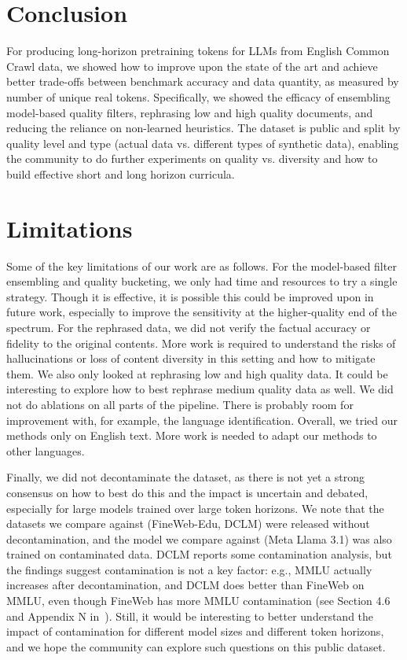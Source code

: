 \documentclass[11pt]{article}
\begin{document}
\section{Conclusion}

For producing long-horizon pretraining tokens for LLMs from English Common Crawl data, we showed how to improve upon the state of the art and achieve better trade-offs between benchmark accuracy and data quantity, as measured by number of unique real tokens. Specifically, we showed the efficacy of ensembling model-based quality filters, rephrasing low and high quality documents, and reducing the reliance on non-learned heuristics. The dataset is public and split by quality level and type (actual data vs. different types of synthetic data), enabling the community to do further experiments on quality vs. diversity and how to build effective short and long horizon curricula.

\section{Limitations}

Some of the key limitations of our work are as follows. For the model-based filter ensembling and quality bucketing, we only had time and resources to try a single strategy. Though it is effective, it is possible this could be improved upon in future work, especially to improve the sensitivity at the higher-quality end of the spectrum. For the rephrased data, we did not verify the factual accuracy or fidelity to the original contents. More work is required to understand the risks of hallucinations or loss of content diversity in this setting and how to mitigate them. We also only looked at rephrasing low and high quality data. It could be interesting to explore how to best rephrase medium quality data as well. We did not do ablations on all parts of the pipeline. There is probably room for improvement with, for example, the language identification. Overall, we tried our methods only on English text. More work is needed to adapt our methods to other languages.

Finally, we did not decontaminate the dataset, as there is not yet a strong consensus on how to best do this and the impact is uncertain and debated, especially for large models trained over large token horizons. We note that the datasets we compare against (FineWeb-Edu, DCLM) were released without decontamination, and the model we compare against (Meta Llama 3.1) was also trained on contaminated data. DCLM reports some contamination analysis, but the findings suggest contamination is not a key factor: e.g., MMLU actually increases after decontamination, and DCLM does better than FineWeb on MMLU, even though FineWeb has more MMLU contamination (see Section 4.6 and Appendix N in~\citet{li2024datacomp}). Still, it would be interesting to better understand the impact of contamination for different model sizes and different token horizons, and we hope the community can explore such questions on this public dataset.
\end{document}
